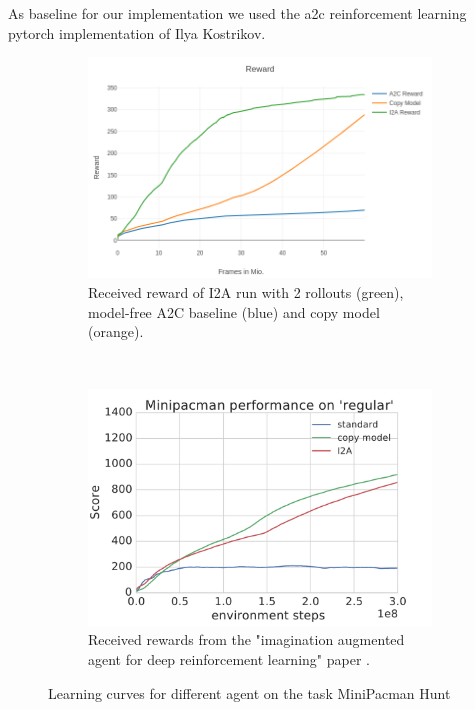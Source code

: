 As baseline for our implementation we used the a2c reinforcement learning pytorch implementation of Ilya Kostrikov\cite{pytorchrl}.

\begin{figure}[H] 
    \centering
    \begin{subfigure}[b]{0.45\textwidth}
        \includegraphics[width=\textwidth]{./Images/regular_rewards_compare.png}
  		\caption{Received reward of I2A run with 2 rollouts (green), model-free A2C baseline (blue) and copy model (orange).} 
  		\label{fig:mini_pacman_regular_rewards} 
    \end{subfigure}
	~ %
    \begin{subfigure}[b]{0.45\textwidth}
        \includegraphics[width=\textwidth]{./Images/minipacman_regular.pdf}
  		\caption{Received rewards from the "imagination augmented agent for deep reinforcement learning" paper \cite{I2A}.} 
  		\label{fig:mini_pacman_regular_original_rewards}
    \end{subfigure}
    
    \caption{Learning curves for different agent on the task MiniPacman Hunt}\label{fig:mini_pacman_regular}
\end{figure}

